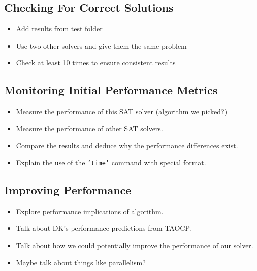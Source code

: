 \documentclass{article}
\begin{document}
\subsection{Checking For Correct Solutions}
\begin{itemize}
    \item Add results from test folder
    \item Use two other solvers and give them the same problem
    \item Check at least 10 times to ensure consistent results
\end{itemize}

\subsection{Monitoring Initial Performance Metrics}
\begin{itemize}
    \item Measure the performance of this SAT solver (algorithm we picked?)
    \item Measure the performance of other SAT solvers.
    \item Compare the results and deduce why the performance differences exist.
    \item Explain the use of the \texttt{'time'} command with special format.
\end{itemize}

\subsection{Improving Performance}
\begin{itemize}
    \item Explore performance implications of algorithm.
    \item Talk about DK's performance predictions from TAOCP.
    \item Talk about how we could potentially improve the performance of our solver.
    \item Maybe talk about things like parallelism?
\end{itemize}
\end{document}
